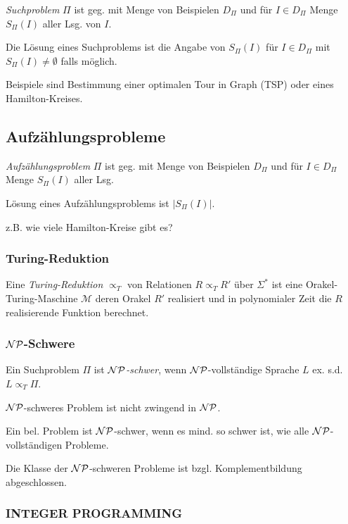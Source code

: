 \emph{Suchproblem} $\Pi$ ist geg. mit Menge von Beispielen $D_\Pi$ und für $I \in D_\Pi$ Menge $S_\Pi(I)$ aller Lsg. von $I$.

Die Lösung eines Suchproblems ist die Angabe von $S_\Pi(I)$ für $I \in D_\Pi$ mit $S_\Pi(I) \neq \emptyset$ falls möglich.

\spacing

Beispiele sind Bestimmung einer optimalen Tour in Graph (TSP) oder eines Hamilton-Kreises.

\subsection*{Aufzählungsprobleme}

\emph{Aufzählungsproblem} $\Pi$ ist geg. mit Menge von Beispielen $D_\Pi$ und für $I \in D_\Pi$ Menge $S_\Pi(I)$ aller Lsg.

Lösung eines Aufzählungsproblems ist $|S_\Pi(I)|$.

\spacing

z.B. wie viele Hamilton-Kreise gibt es?

\subsubsection*{Turing-Reduktion}

Eine \emph{Turing-Reduktion} $\propto_T$ von Relationen $R \propto_T R'$ über $\Sigma^*$ ist eine Orakel-Turing-Maschine $\mathcal{M}$ deren Orakel $R'$ realisiert und in polynomialer Zeit die $R$ realisierende Funktion berechnet.

\subsubsection*{$\mathcal{NP}$-Schwere}

Ein Suchproblem $\Pi$ ist \emph{$\mathcal{NP}$-schwer}, wenn $\mathcal{NP}$-vollständige Sprache $L$ ex. s.d. $L \propto_T \Pi$.

$\mathcal{NP}$-schweres Problem ist nicht zwingend in $\mathcal{NP}$.

Ein bel. Problem ist $\mathcal{NP}$-schwer, wenn es mind. so schwer ist, wie alle $\mathcal{NP}$-vollständigen Probleme.

\spacing

Die Klasse der $\mathcal{NP}$-schweren Probleme ist bzgl. Komplementbildung abgeschlossen.

\subsubsection*{INTEGER PROGRAMMING}

